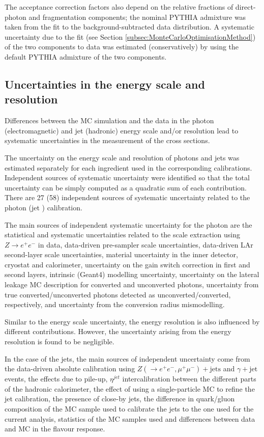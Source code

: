 \documentclass[12pt, twoside]{article}
\numberwithin{equation}{section}
\numberwithin{figure}{section}
\begin{document}
The acceptance correction factors also depend on the relative fractions of direct-photon and fragmentation components; the nominal PYTHIA admixture was taken from the fit to the background-subtracted data distribution. A systematic uncertainty due to the fit (see Section \ref{subsec:MonteCarloOptimisationMethod}) of the two components to data was estimated (conservatively) by using the default PYTHIA admixture of the two components.

\subsection{Uncertainties in the energy scale and resolution}
\label{subsec:UncertaintiesInTheEnergyScaleAndResolution}

Differences between the MC simulation and the data in the photon (electromagnetic) and jet (hadronic) energy scale and/or resolution lead to systematic uncertainties in the measurement of the cross sections.

The uncertainty on the energy scale and resolution of photons and jets was estimated separately for each ingredient used in the corresponding calibrations. Independent sources of systematic uncertainty were identified so that the total uncertainty can be simply computed as a quadratic sum of each contribution. There are 27 (58) independent sources of systematic uncertainty related to the photon \cite{PhotonCalib} (jet \cite{JetCalib}) calibration.

The main sources of independent systematic uncertainty for the photon are the statistical and systematic uncertainties related to the scale extraction using $Z \rightarrow e^{+} e^{-}$ in data, data-driven pre-sampler scale uncertainties, data-driven LAr second-layer scale uncertainties, material uncertainty in the inner detector, cryostat and calorimeter, uncertainty on the gain switch correction in first and second layers, intrinsic (Geant4) modelling uncertainty, uncertainty on the lateral leakage MC description for converted and unconverted photons, uncertainty from true converted/unconverted photons detected as unconverted/converted, respectively, and uncertainty from the conversion radius mismodelling.

Similar to the energy scale uncertainty, the energy resolution is also influenced by different contributions. However, the uncertainty arising from the energy resolution is found to be negligible.

In the case of the jets, the main sources of independent uncertainty come from the data-driven absolute calibration using $Z \left( \rightarrow e^{+} e^{-}, \mu^{+} \mu^{-} \right) + \text{jets}$ and $\gamma+\text{jet}$ events, the effects due to pile-up, $\eta^{jet}$ intercalibration between the different parts of the hadronic calorimeter, the effect of using a single-particle MC to refine the jet calibration, the presence of close-by jets, the difference in quark/gluon composition of the MC sample used to calibrate the jets to the one used for the current analysis, statistics of the MC samples used and differences between data and MC in the flavour response.
\end{document}
